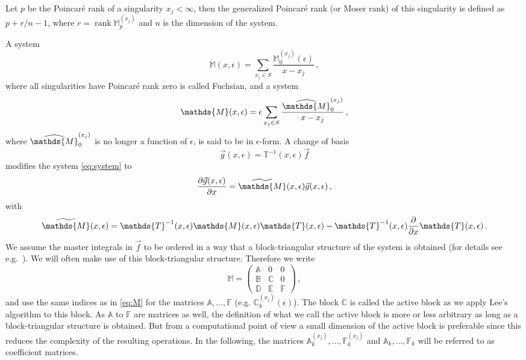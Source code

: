 \documentclass[12pt]{article}
\numberwithin{equation}{section}
\numberwithin{figure}{section}
\newcommand{\M}{\mathds{M}}
\newcommand{\A}{\mathds{A}}
\newcommand{\B}{\mathds{B}}
\newcommand{\C}{\mathds{C}}
\newcommand{\D}{\mathds{D}}
\newcommand{\E}{\mathds{E}}
\newcommand{\F}{\mathds{F}}
\newcommand{\T}{\mathds{T}}
\DeclareMathOperator{\rank}{rank}
\begin{document}
      Let $p$ be the Poincar\'{e} rank of a singularity $x_j<\infty$, then the generalized Poincar\'{e} rank (or Moser rank) \cite{Moser:1959} of this singularity is defined as $p + r/n - 1$, where $r = \rank \M^{(x_j)}_p$ and $n$ is the dimension of the system.

      A system
      \begin{equation} \label{eq:fuchsian}
        \M(x,\epsilon) 
        = 
        \sum\limits_{x_j \in S} 
        \frac{\M^{(x_j)}_0(\epsilon)}{x-x_j}\,,
      \end{equation}
      where all singularities have Poincar\'{e} rank zero is called Fuchsian, and a system
      \begin{equation} \label{eq:epform}
        \M(x,\epsilon) 
        = 
        \epsilon \sum\limits_{x_j \in S} 
        \frac{\widehat\M^{(x_j)}_0}{x-x_j}\,,
      \end{equation}
      where $\widehat\M^{(x_j)}_0$ is no longer a function of $\epsilon$, is said to be in $\epsilon$-form.
      A change of basis
      \[
        \vec{g}(x,\epsilon) = \T^{-1}(x,\epsilon) \vec{f}
      \]
      modifies the system \eqref{eq:system} to 
      \[
        \frac{\partial \vec{g}(x,\epsilon)}{\partial x} 
        = 
        \widetilde\M(x,\epsilon) \vec{g}(x,\epsilon)\,,
      \]
      with
      \begin{equation} \label{eq:trans}
        \widetilde\M(x,\epsilon)
        =
        \T^{-1}(x,\epsilon)
        \M(x,\epsilon)
        \T(x,\epsilon)
        -
        \T^{-1}(x,\epsilon)
        \frac{\partial}{\partial x}
        \T(x,\epsilon)\,.
      \end{equation}
      We assume the master integrals in $\vec{f}$ to be ordered in a way that a block-triangular structure of the system is obtained (for details see e.g.~\cite{Lee:2014ioa}).
      We will often make use of this block-triangular structure.
      Therefore we write
      \begin{equation} \label{eq:triangular}
        \M
        =
        \begin{pmatrix}
          \A & 0 & 0 \\
          \B & \C & 0 \\
          \D & \E & \F
        \end{pmatrix}\,,
      \end{equation}
      and use the same indices as in \eqref{eq:M} for the matrices $\A,\dots,\F$ (e.g. $\C^{(x_j)}_k(\epsilon)$).
      The block $\C$ is called the active block as we apply Lee's algorithm to this block.
      As $\A$ to $\F$ are matrices as well, the definition of what we call the active block is more or less arbitrary as long as a block-triangular structure is obtained.
      But from a computational point of view a small dimension of the active block is preferable since this reduces the complexity of the resulting operations.
      In the following, the matrices $\A^{(x_j)}_k, \dots, \F^{(x_j)}_k$ and $\A_k,\dots,\F_k$ will be referred to as coefficient matrices.
\end{document}
